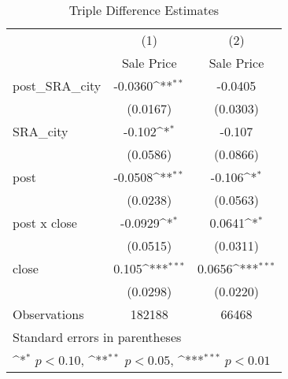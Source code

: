\begin{table}[htbp]\centering
\def\sym#1{\ifmmode^{#1}\else\(^{#1}\)\fi}
\caption{Triple Difference Estimates\label{tabl}}
\begin{tabular}{l*{2}{c}}
\hline\hline
                    &\multicolumn{1}{c}{(1)}&\multicolumn{1}{c}{(2)}\\
                    &\multicolumn{1}{c}{Sale Price}&\multicolumn{1}{c}{Sale Price}\\
\hline
post\_SRA\_city       &     -0.0360\sym{**} &     -0.0405         \\
                    &    (0.0167)         &    (0.0303)         \\
[1em]
SRA\_city            &      -0.102\sym{*}  &      -0.107         \\
                    &    (0.0586)         &    (0.0866)         \\
[1em]
post                &     -0.0508\sym{**} &      -0.106\sym{*}  \\
                    &    (0.0238)         &    (0.0563)         \\
[1em]
post x close        &     -0.0929\sym{*}  &      0.0641\sym{*}  \\
                    &    (0.0515)         &    (0.0311)         \\
[1em]
close               &       0.105\sym{***}&      0.0656\sym{***}\\
                    &    (0.0298)         &    (0.0220)         \\
\hline
Observations        &      182188         &       66468         \\
\hline\hline
\multicolumn{3}{l}{\footnotesize Standard errors in parentheses}\\
\multicolumn{3}{l}{\footnotesize \sym{*} \(p<0.10\), \sym{**} \(p<0.05\), \sym{***} \(p<0.01\)}\\
\end{tabular}
\end{table}
